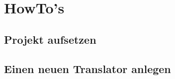 \documentclass[12pt]{scrreprt}
\begin{document}
\section{HowTo's}
\subsection{Projekt aufsetzen}
\subsection{Einen neuen Translator anlegen}

{}

\end{document}
